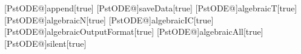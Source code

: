 %
%
[PstODE@]{append}[true]{}%
[PstODE@]{saveData}[true]{}%
[PstODE@]{algebraicT}[true]{}%
[PstODE@]{algebraicN}[true]{}%
[PstODE@]{algebraicIC}[true]{}%
[PstODE@]{algebraicOutputFormat}[true]{}%
[PstODE@]{algebraicAll}[true]{}%
[PstODE@]{silent}[true]{}%
%
%
\def\pstODEsolve{\def\pst@par{}\pst@object{pstODEsolve}}%
